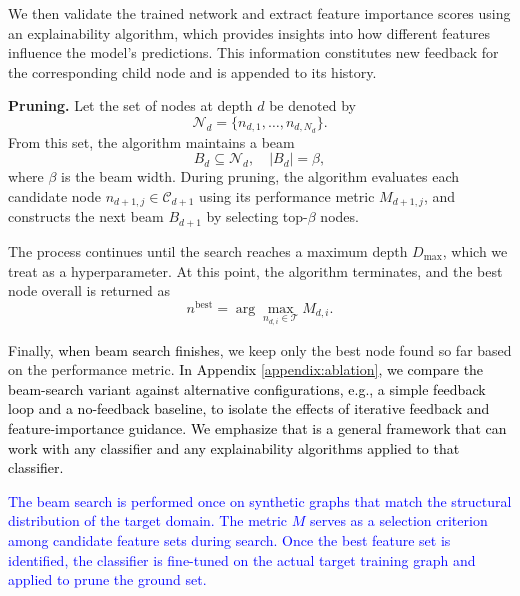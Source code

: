We then validate the trained network and extract feature importance scores using an explainability algorithm, which provides insights into how different features influence the model’s predictions. This information constitutes new feedback for the corresponding child node and is appended to its history.


\textbf{Pruning.} Let the set of nodes at depth $d$ be denoted by
\[
\mathcal{N}_d = \{ n_{d,1}, \dots, n_{d,N_d} \}.
\]
From this set, the algorithm maintains a beam
\[
B_d \subseteq \mathcal{N}_d, \quad |B_d| = \beta,
\]
where $\beta$ is the beam width.  During pruning, the algorithm evaluates each candidate node $n_{d+1,j} \in \mathcal{C}_{d+1}$ using its performance metric $M_{d+1,j}$, and constructs the next beam $B_{d+1}$ by selecting top-$\beta$ nodes.



The process continues until the search reaches a maximum depth $D_{\max}$, which we treat as a hyperparameter. At this point, the algorithm terminates, and the best node overall is returned as
\[
n^{\mathrm{best}} = \arg\max_{n_{d,i} \in \mathcal{T}} M_{d,i}.
\]

Finally, \textcolor{black}{when beam search finishes}, we keep only the best node found so far based on the performance metric. \textcolor{black}{In Appendix \ref{appendix:ablation}, we compare the beam-search variant against alternative configurations, e.g., a simple feedback loop and a no-feedback baseline, to isolate the effects of iterative feedback and feature-importance guidance.} \textcolor{black}{ We emphasize that \llm is a general framework that can work with any classifier and any explainability algorithms applied to that classifier.}

\textcolor{blue}{The beam search is performed once on synthetic graphs that match the structural distribution of the target domain. The metric $M$ serves as a selection criterion among candidate feature sets during search. Once the best feature set is identified, the classifier is fine-tuned on the actual target training graph and applied to prune the ground set.}

